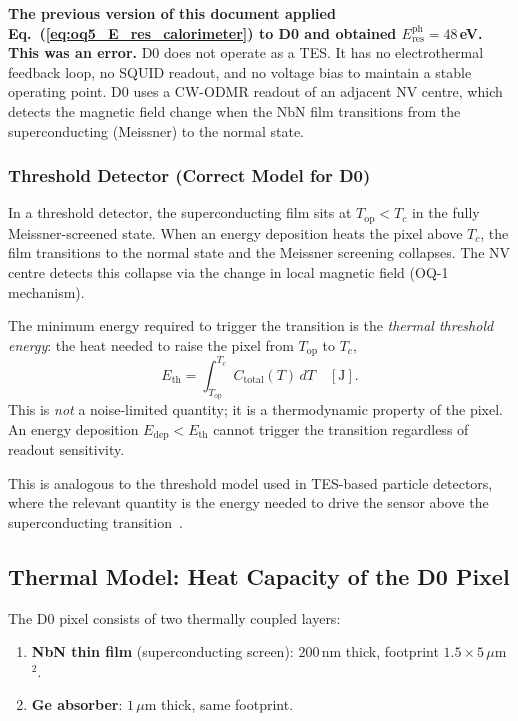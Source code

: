 \textbf{The previous version of this document applied
Eq.~(\ref{eq:oq5_E_res_calorimeter}) to D0 and obtained
$E_\mathrm{res}^\mathrm{ph} = 48$\,eV. This was an error.} D0 does
not operate as a TES. It has no electrothermal feedback loop, no SQUID
readout, and no voltage bias to maintain a stable operating point. D0 uses a
CW-ODMR readout of an adjacent NV centre, which detects the magnetic field
change when the NbN film transitions from the superconducting (Meissner) to
the normal state.

\subsubsection{Threshold Detector (Correct Model for D0)}

In a threshold detector, the superconducting film sits at
$T_\mathrm{op} < T_c$ in the fully Meissner-screened state. When an energy
deposition heats the pixel above $T_c$, the film transitions to the normal
state and the Meissner screening collapses. The NV centre detects this
collapse via the change in local magnetic field (OQ-1 mechanism).

The minimum energy required to trigger the transition is the \emph{thermal
threshold energy}: the heat needed to raise the pixel from $T_\mathrm{op}$
to $T_c$,
\begin{equation}
  \boxed{
  E_\mathrm{th} = \int_{T_\mathrm{op}}^{T_c} C_\mathrm{total}(T)\,dT
  \quad [\text{J}].
  }
  \label{eq:oq5_E_th_def}
\end{equation}
This is \emph{not} a noise-limited quantity; it is a thermodynamic property
of the pixel. An energy deposition $E_\mathrm{dep} < E_\mathrm{th}$ cannot
trigger the transition regardless of readout sensitivity.

This is analogous to the threshold model used in TES-based particle
detectors, where the relevant quantity is the energy needed to drive the
sensor above the superconducting
transition~\cite{APPEC2021DirectDetection}. %

\subsection{Thermal Model: Heat Capacity of the D0 Pixel}
\label{sec:oq5_thermal_model}

The D0 pixel consists of two thermally coupled layers:
\begin{enumerate}
  \item \textbf{NbN thin film} (superconducting screen): $200$\,nm
    thick, footprint $1.5 \times 5$\,$\mu$m$^2$.
  \item \textbf{Ge absorber}: $1$\,$\mu$m thick, same footprint.
\end{enumerate}

